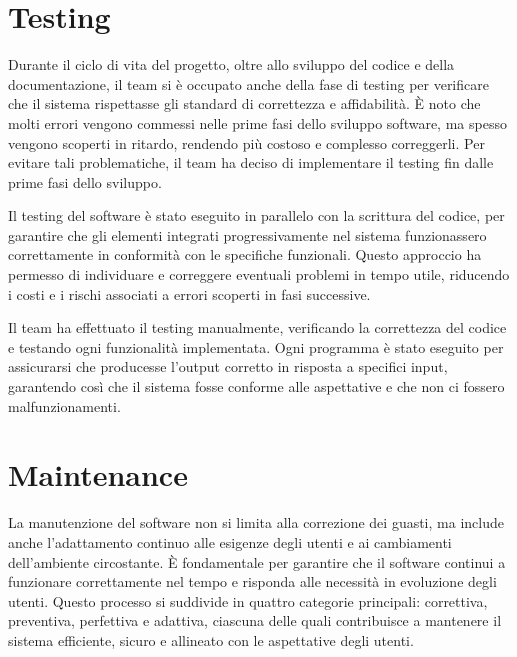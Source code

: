 \documentclass[a4paper,12pt]{article}
\begin{document}
\section{Testing}
Durante il ciclo di vita del progetto, oltre allo sviluppo del codice e della documentazione, il team si è occupato anche della fase di testing per verificare che il sistema rispettasse gli standard di correttezza e affidabilità. È noto che molti errori vengono commessi nelle prime fasi dello sviluppo software, ma spesso vengono scoperti in ritardo, rendendo più costoso e complesso correggerli. Per evitare tali problematiche, il team ha deciso di implementare il testing fin dalle prime fasi dello sviluppo.

Il testing del software è stato eseguito in parallelo con la scrittura del codice, per garantire che gli elementi integrati progressivamente nel sistema funzionassero correttamente in conformità con le specifiche funzionali. Questo approccio ha permesso di individuare e correggere eventuali problemi in tempo utile, riducendo i costi e i rischi associati a errori scoperti in fasi successive.

Il team ha effettuato il testing manualmente, verificando la correttezza del codice e testando ogni funzionalità implementata. Ogni programma è stato eseguito per assicurarsi che producesse l'output corretto in risposta a specifici input, garantendo così che il sistema fosse conforme alle aspettative e che non ci fossero malfunzionamenti.

\section{Maintenance}

La manutenzione del software non si limita alla correzione dei guasti, ma include anche l'adattamento continuo alle esigenze degli utenti e ai cambiamenti dell'ambiente circostante. È fondamentale per garantire che il software continui a funzionare correttamente nel tempo e risponda alle necessità in evoluzione degli utenti. Questo processo si suddivide in quattro categorie principali: correttiva, preventiva, perfettiva e adattiva, ciascuna delle quali contribuisce a mantenere il sistema efficiente, sicuro e allineato con le aspettative degli utenti.
\end{document}
